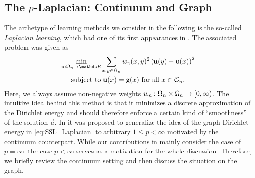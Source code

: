 \subsection{The $p$-Laplacian: Continuum and Graph}\label{sec:pLap}
%
%
The archetype of learning methods we consider in the following is the so-called \emph{Laplacian learning}, which had one of its first appearances in 
\cite{zhu2003semi}. The associated problem was given as
%
\begin{gather}\label{eq:SSL_Laplacian}
	\begin{gathered}
		\min_{\vec u:\domain_n\to\R} \sum_{x,y\in\domain_n} w_n(x,y)^2 
		\left(\vec u(y) - \vec u(x) \right)^2\\
		\text{subject to } \vec u(x) = \vec g(x) \text{ for all } x\in\conset_n.
	\end{gathered}
\end{gather}
%
%
%
Here, we always assume non-negative weights $w_n:\Omega_n\times\Omega_n\to[0,\infty)$. The intuitive idea behind this method is that it minimizes a discrete approximation of the Dirichlet energy and should therefore enforce a certain kind of \enquote{smoothness} of the solution $\vec u$. In \cite{zhou2005regularization} it was proposed to generalize the idea of the graph Dirichlet energy in \cref{eq:SSL_Laplacian} to arbitrary $1\leq p < \infty$ motivated by the continuum counterpart. While our contributions in \cite{roith2022continuum, bungert2021uniform, bungert2022ratio} mainly consider the case of $p=\infty$, the case $p<\infty$ serves as a  motivation for the whole discussion. Therefore, we briefly review the continuum setting and then discuss the situation on the graph.
%
%
%
%
